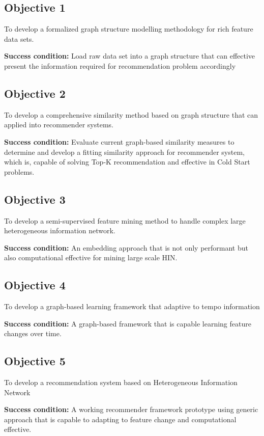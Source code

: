 \subsection*{Objective 1}
To develop a formalized graph structure modelling methodology for rich feature data sets. 

\textbf{Success condition:} Load raw data set into a graph structure that can effective present the information required for recommendation problem accordingly 

\subsection*{Objective 2} 
To develop a comprehensive similarity method based on graph structure that can applied into recommender systems. 

\textbf{Success condition:} Evaluate current graph-based similarity measures to determine and develop a fitting similarity approach for recommender system, which is, capable of solving Top-K recommendation and effective in Cold Start problems. 

\subsection*{Objective 3}
To develop a semi-supervised feature mining method to handle complex large heterogeneous information network. 

\textbf{Success condition:} An embedding approach that is not only performant but also computational effective for mining large scale HIN. 

\subsection*{Objective 4} 
To develop a graph-based learning framework that adaptive to tempo information 

\textbf{Success condition:} A graph-based framework that is capable learning feature changes over time. 

\subsection*{Objective 5} 
To develop a recommendation system based on Heterogeneous Information Network 

\textbf{Success condition:} A working recommender framework prototype using generic approach that is capable to  adapting to feature change and computational effective.  

